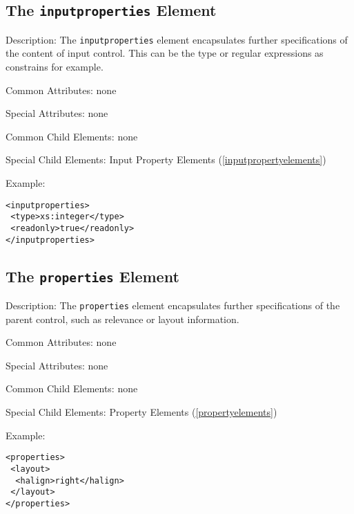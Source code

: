 \subsection{ The \texttt{inputproperties} Element}
\label{inputproperties}
\begin{description}
 \item Description: The \texttt{inputproperties} element encapsulates further specifications of the content of input control. This can be the type or regular expressions as constrains for example.

 \item Common Attributes: none

 \item Special Attributes: none

 \item Common Child Elements: none

 \item Special Child Elements: Input Property Elements (\ref{inputpropertyelements})

 \item Example: 

\begin{lstlisting}[caption=\texttt{properties} Element]
<inputproperties>
 <type>xs:integer</type>
 <readonly>true</readonly>
</inputproperties>
\end{lstlisting}
\end{description}




\subsection{ The \texttt{properties} Element}
\label{properties}
\begin{description}
 \item Description: The \texttt{properties} element encapsulates further specifications of the parent control, such as relevance or layout information.

 \item Common Attributes: none

 \item Special Attributes: none

 \item Common Child Elements: none

 \item Special Child Elements: Property Elements (\ref{propertyelements})

 \item Example: 

\begin{lstlisting}[caption=\texttt{properties} Element]
<properties>
 <layout>
  <halign>right</halign>
 </layout>
</properties>
\end{lstlisting}
\end{description}
